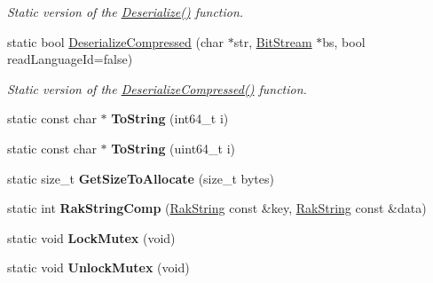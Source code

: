 \begin{DoxyCompactItemize}
\begin{DoxyCompactList}\small\item\em Static version of the \hyperlink{class_rak_net_1_1_rak_string_ab5bf3364843b0b354a28582e1b2f35d4}{Deserialize()} function. \end{DoxyCompactList}\item 
\hypertarget{class_rak_net_1_1_rak_string_a106cc085fe4ec70bb5cc42724f42c2f2}{static bool \hyperlink{class_rak_net_1_1_rak_string_a106cc085fe4ec70bb5cc42724f42c2f2}{Deserialize\-Compressed} (char $\ast$str, \hyperlink{class_rak_net_1_1_bit_stream}{Bit\-Stream} $\ast$bs, bool read\-Language\-Id=false)}\label{class_rak_net_1_1_rak_string_a106cc085fe4ec70bb5cc42724f42c2f2}

\begin{DoxyCompactList}\small\item\em Static version of the \hyperlink{class_rak_net_1_1_rak_string_a8d30ae45770db0b21f15a0a58466cd8e}{Deserialize\-Compressed()} function. \end{DoxyCompactList}\item 
\hypertarget{class_rak_net_1_1_rak_string_a50f6873a0aefc4077a6484c737cfac0c}{static const char $\ast$ {\bfseries To\-String} (int64\-\_\-t i)}\label{class_rak_net_1_1_rak_string_a50f6873a0aefc4077a6484c737cfac0c}

\item 
\hypertarget{class_rak_net_1_1_rak_string_af939998fed8400fb2e24579e0508517f}{static const char $\ast$ {\bfseries To\-String} (uint64\-\_\-t i)}\label{class_rak_net_1_1_rak_string_af939998fed8400fb2e24579e0508517f}

\item 
\hypertarget{class_rak_net_1_1_rak_string_ad5e713f4786eb0e4a391f72ab488be25}{static size\-\_\-t {\bfseries Get\-Size\-To\-Allocate} (size\-\_\-t bytes)}\label{class_rak_net_1_1_rak_string_ad5e713f4786eb0e4a391f72ab488be25}

\item 
\hypertarget{class_rak_net_1_1_rak_string_af8c9ecec19e6fcf4b75550dede34f203}{static int {\bfseries Rak\-String\-Comp} (\hyperlink{class_rak_net_1_1_rak_string}{Rak\-String} const \&key, \hyperlink{class_rak_net_1_1_rak_string}{Rak\-String} const \&data)}\label{class_rak_net_1_1_rak_string_af8c9ecec19e6fcf4b75550dede34f203}

\item 
\hypertarget{class_rak_net_1_1_rak_string_a2e732924f8a2adc95fcb7a652fa2aa13}{static void {\bfseries Lock\-Mutex} (void)}\label{class_rak_net_1_1_rak_string_a2e732924f8a2adc95fcb7a652fa2aa13}

\item 
\hypertarget{class_rak_net_1_1_rak_string_a5d7241519c6c5d5bea245f926237a9bd}{static void {\bfseries Unlock\-Mutex} (void)}\label{class_rak_net_1_1_rak_string_a5d7241519c6c5d5bea245f926237a9bd}

\end{DoxyCompactItemize}
